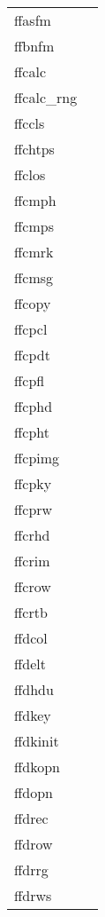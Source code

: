 \documentclass[11pt]{book}
\begin{document}
\newpage
\begin{tabular}{lr}
ffasfm    & \pageref{ffasfm} \\
ffbnfm   & \pageref{ffbnfm} \\
ffcalc     & \pageref{ffcalc} \\
ffcalc\_rng     & \pageref{ffcalcrng} \\
ffccls     & \pageref{ffccls} \\
ffchtps    & \pageref{ffchtps} \\
ffclos     & \pageref{ffclos} \\
ffcmph & \pageref{ffcmph} \\
ffcmps    & \pageref{ffcmps} \\
ffcmrk  & \pageref{ffpmrk} \\
ffcmsg  & \pageref{ffcmsg} \\
ffcopy     & \pageref{ffcopy} \\
ffcpcl     & \pageref{ffcpcl} \\
ffcpdt      & \pageref{ffcpdt} \\
ffcpfl      & \pageref{ffcpfl} \\
ffcphd   & \pageref{ffcphd} \\
ffcpht   & \pageref{ffcpht} \\
ffcpimg  & \pageref{ffcpimg} \\
ffcpky       & \pageref{ffcpky} \\
ffcprw      &   \pageref{ffcprw} \\
ffcrhd     & \pageref{ffcrhd} \\
ffcrim     & \pageref{ffcrim} \\
ffcrow    & \pageref{ffcrow} \\
ffcrtb     & \pageref{ffcrtb} \\
ffdcol   & \pageref{ffdcol} \\
ffdelt    & \pageref{ffdelt} \\
ffdhdu     & \pageref{ffdhdu} \\
ffdkey     & \pageref{ffdkey} \\
ffdkinit  & \pageref{ffinit} \\
ffdkopn      & \pageref{ffopen} \\
ffdopn      & \pageref{ffopen} \\
ffdrec  & \pageref{ffdrec} \\
ffdrow  & \pageref{ffdrow} \\
ffdrrg  & \pageref{ffdrrg} \\
ffdrws & \pageref{ffdrws} \\

\end{tabular}
\end{document}
